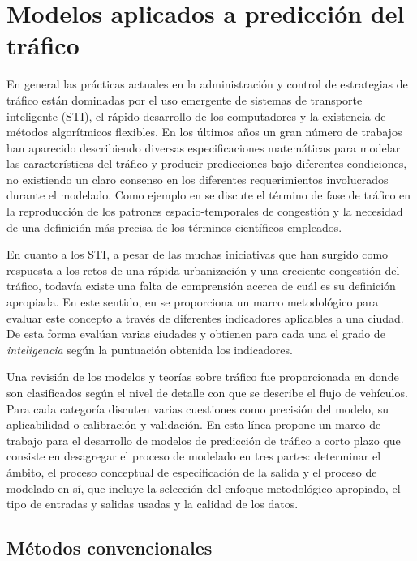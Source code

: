 \documentclass{llncs}
\begin{document}
\section{Modelos aplicados a predicción del tráfico}

En general las prácticas actuales en la administración y control de estrategias de tráfico están dominadas por el uso emergente de sistemas de transporte inteligente (STI), el rápido desarrollo de los computadores y la existencia de métodos algorítmicos flexibles. En los últimos años un gran número de trabajos han aparecido describiendo diversas especificaciones matemáticas para modelar las características del tráfico y producir predicciones bajo diferentes condiciones, no existiendo un claro consenso en los diferentes requerimientos involucrados durante el modelado.  Como ejemplo en \cite{Treiber2010983} se discute el término de fase de tráfico en la reproducción de los patrones espacio-temporales de congestión y la necesidad de una definición más precisa de los términos científicos empleados. 

En cuanto a los STI, a pesar de las muchas iniciativas que han surgido como respuesta a los retos de una rápida urbanización y una creciente congestión del tráfico, todavía existe una falta de comprensión acerca de cuál es su definición apropiada. En este sentido, en \cite{Debnath201447} se proporciona un marco metodológico para evaluar este concepto a través de diferentes indicadores aplicables a una ciudad. De esta forma evalúan varias ciudades y obtienen para cada una el grado de \emph{inteligencia} según la puntuación obtenida los indicadores.

Una revisión de los modelos y teorías sobre tráfico fue proporcionada en \cite{Hoogendoorn2001283} donde son clasificados según el nivel de detalle con que se describe el flujo de vehículos. Para cada categoría discuten varias cuestiones como precisión del modelo, su aplicabilidad o calibración y validación.  En esta línea \cite{Vlahogianni2004533} propone un marco de trabajo para el desarrollo de modelos de predicción de tráfico a corto plazo que consiste en desagregar el proceso de modelado en tres partes: determinar el ámbito, el proceso conceptual de especificación de la salida y el proceso de modelado en sí, que incluye la selección del enfoque metodológico apropiado, el tipo de entradas y salidas usadas y la calidad de los datos.


\subsection{Métodos convencionales}
\end{document}
